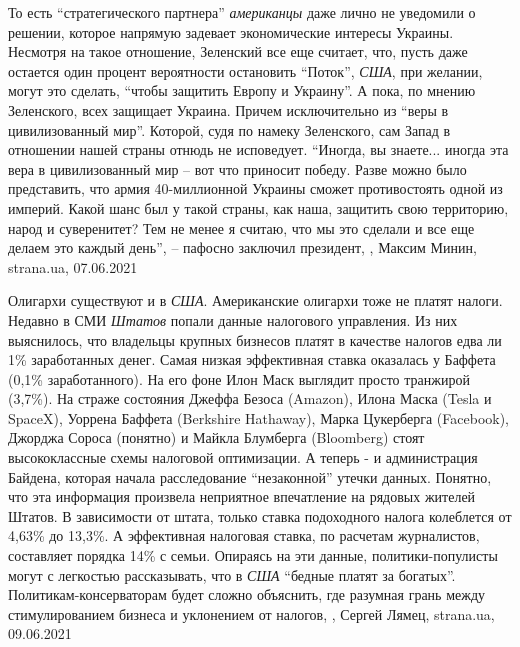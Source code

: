 То есть \enquote{стратегического партнера} \emph{американцы} даже лично не
уведомили о решении, которое напрямую задевает экономические интересы Украины.
Несмотря на такое отношение, Зеленский все еще считает, что, пусть даже
остается один процент вероятности остановить \enquote{Поток}, \emph{США}, при
желании, могут это сделать, \enquote{чтобы защитить Европу и Украину}. А пока,
по мнению Зеленского, всех защищает Украина. Причем исключительно из
\enquote{веры в цивилизованный мир}. Которой, судя по намеку Зеленского, сам
Запад в отношении нашей страны отнюдь не исповедует. \enquote{Иногда, вы
знаете... иногда эта вера в цивилизованный мир – вот что приносит победу. Разве
можно было представить, что армия 40-миллионной Украины сможет противостоять
одной из империй. Какой шанс был у такой страны, как наша, защитить свою
территорию, народ и суверенитет? Тем не менее я считаю, что мы это сделали и
все еще делаем это каждый день}, – пафосно заключил президент,
, Максим Минин, strana.ua, 07.06.2021

Олигархи существуют и в \emph{США}. Американские олигархи тоже не платят налоги.
Недавно в СМИ \emph{Штатов} попали данные налогового управления. Из них выяснилось,
что владельцы крупных бизнесов платят в качестве налогов едва ли 1\%
заработанных денег. Самая низкая эффективная ставка оказалась у Баффета (0,1\%
заработанного). На его фоне Илон Маск выглядит просто транжирой (3,7\%).  На
страже состояния Джеффа Безоса (Amazon), Илона Маска (Tesla и SpaceX), Уоррена
Баффета (Berkshire Hathaway), Марка Цукерберга (Facebook), Джорджа Сороса
(понятно) и Майкла Блумберга (Bloomberg) стоят высококлассные схемы налоговой
оптимизации. А теперь - и администрация Байдена, которая начала расследование
\enquote{незаконной} утечки данных.  Понятно, что эта информация произвела неприятное
впечатление на рядовых жителей Штатов. В зависимости от штата, только ставка
подоходного налога колеблется от 4,63\% до 13,3\%. А эффективная налоговая
ставка, по расчетам журналистов, составляет порядка 14\% с семьи. Опираясь на
эти данные, политики-популисты могут с легкостью рассказывать, что в \emph{США}
\enquote{бедные платят за богатых}. Политикам-консерваторам будет сложно объяснить, где
разумная грань между стимулированием бизнеса и уклонением от налогов,
, Сергей Лямец, strana.ua, 09.06.2021


